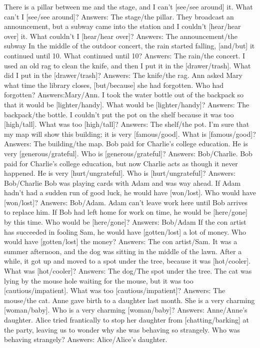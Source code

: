 \begin{foo}
There is a pillar between me and the stage, and I can't [see/see around] it. What can't I [see/see around]? Answers: The stage/the pillar.
They broadcast an announcement, but a subway came into the station and I couldn't [hear/hear over] it. What couldn't I [hear/hear over]? Answers: The announcement/the subway
In the middle of the outdoor concert, the rain started falling, [and/but] it continued until 10. What continued until 10? Answers: The rain/the concert.
I used an old rag to clean the knife, and then I put it in the [drawer/trash]. What did I put in the [drawer/trash]? Answers: The knife/the rag.
Ann asked Mary what time the library closes, [but/because] she had forgotten. Who had forgotten? Answers:Mary/Ann.
I took the water bottle out of the backpack so that it would be [lighter/handy]. What would be [lighter/handy]? Answers: The backpack/the bottle.
I couldn't put the pot on the shelf because it was too [high/tall]. What was too [high/tall]? Answers: The shelf/the pot.
I'm sure that my map will show this building; it is very [famous/good]. What is [famous/good]? Answers: The building/the map.
Bob paid for Charlie's college education. He is very [generous/grateful]. Who is [generous/grateful]? Answers: Bob/Charlie.
Bob paid for Charlie's college education, but now Charlie acts as though it never happened. He is very [hurt/ungrateful]. Who is [hurt/ungrateful]? Answers: Bob/Charlie
Bob was playing cards with Adam and was way ahead. If Adam hadn't had a sudden run of good luck, he would have [won/lost]. Who would have [won/lost]? Answers: Bob/Adam.
Adam can't leave work here until Bob arrives to replace him. If Bob had left home for work on time, he would be [here/gone] by this time. Who would be [here/gone]? Answers: Bob/Adam
If the con artist has succeeded in fooling Sam, he would have [gotten/lost] a lot of money. Who would have [gotten/lost] the money? Answers: The con artist/Sam.
It was a summer afternoon, and the dog was sitting in the middle of the lawn. After a while, it got up and moved to a spot under the tree, because it was [hot/cooler]. What was [hot/cooler]? Answers: The dog/The spot  under the tree.
The cat was lying by the mouse hole waiting for the mouse, but it was too [cautious/impatient]. What was too [cautious/impatient]? Answers: The mouse/the cat.
Anne gave birth to a daughter last month. She is a very charming [woman/baby]. Who is a very charming [woman/baby]? Answers: Anne/Anne's daughter.
Alice tried frantically to stop her daughter from [chatting/barking] at the party, leaving us to wonder why she was behaving so strangely. Who was behaving strangely? Answers: Alice/Alice's daughter.

\end{foo}
